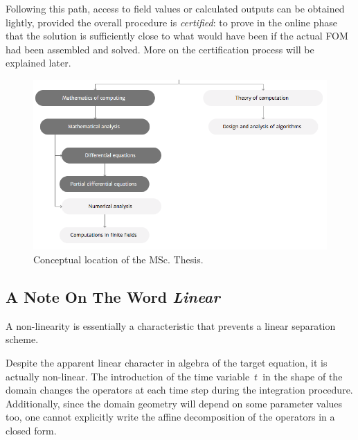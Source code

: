\documentclass[a4paper, technote, compsoc]{IEEEtran}
\begin{document}
Following this path, access to field values or calculated outputs can be obtained lightly, provided the overall procedure is \textit{certified}: 
to prove in the online phase that the solution is sufficiently close to what would have been if the actual FOM had been assembled and solved.
More on the certification process will be explained later.



\begin{figure}[h]
   \includegraphics[width=\columnwidth]{figures/index.png}
   \caption{Conceptual location of the MSc. Thesis.}
\end{figure}

\subsection{A Note On The Word \textit{Linear}}
A non-linearity is essentially a characteristic that prevents a linear separation scheme.

Despite the apparent linear character in algebra of the target equation, it is actually non-linear.
The introduction of the time variable~$t$~in the shape of the domain changes the operators at each time step during the integration procedure. 
Additionally, since the domain geometry will depend on some parameter values too, one cannot explicitly write the affine decomposition of the operators in a closed form.  
\end{document}
